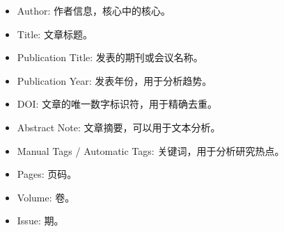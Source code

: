 \documentclass[11pt]{article}
\providecommand{\tightlist}{%
      \setlength{\itemsep}{0pt}\setlength{\parskip}{0pt}}
\begin{document}
\begin{itemize}
\tightlist
\item
  Author: 作者信息，核心中的核心。
\item
  Title: 文章标题。
\item
  Publication Title: 发表的期刊或会议名称。
\item
  Publication Year: 发表年份，用于分析趋势。
\item
  DOI: 文章的唯一数字标识符，用于精确去重。
\item
  Abstract Note: 文章摘要，可以用于文本分析。
\item
  Manual Tags / Automatic Tags: 关键词，用于分析研究热点。
\item
  Pages: 页码。
\item
  Volume: 卷。
\item
  Issue: 期。
\end{itemize}
\end{document}
